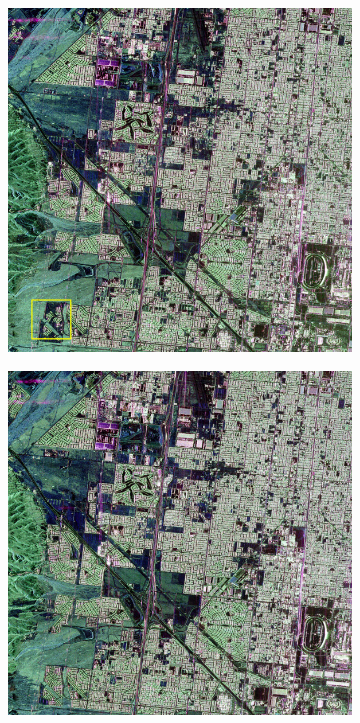 \begin{figure}[tbp]
\centering
\begin{subfigure}[b]{0.3\textwidth}
		\includegraphics[width=\textwidth]{Figures/CD/2009}
		\caption{}
		\label{fig:2_a}
\end{subfigure}
\hspace{0.05pt}
\begin{subfigure}[b]{0.3\textwidth}
		\includegraphics[width=\textwidth]{Figures/CD/2015.jpg}

\end{subfigure}
\end{figure}
